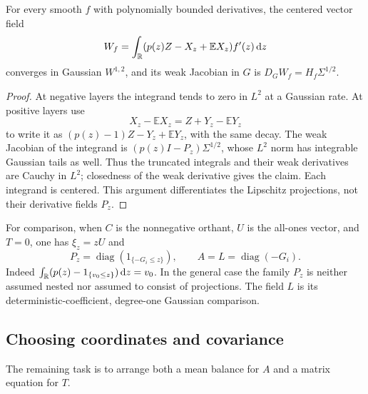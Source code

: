 \begin{lemma}\label{lem:projection-sobolev}
For every smooth $f$ with polynomially bounded derivatives, the centered vector field
\[
W_f=\int_{\mathbb{R}}(p(z)Z-X_z+\mathbb{E}X_z)f'(z)\,\mathrm{d} z
\]
converges in Gaussian $W^{1,2}$, and its weak Jacobian in $G$ is $D_GW_f=H_f\Sigma^{1/2}$.
\end{lemma}
\begin{proof}
At negative layers the integrand tends to zero in $L^2$ at a Gaussian rate. At positive layers use
\[
X_z-\mathbb{E}X_z=Z+Y_z-\mathbb{E}Y_z
\]
to write it as $(p(z)-1)Z-Y_z+\mathbb{E}Y_z$, with the same decay. The weak Jacobian of the integrand is $(p(z)I-P_z)\Sigma^{1/2}$, whose $L^2$ norm has integrable Gaussian tails as well. Thus the truncated integrals and their weak derivatives are Cauchy in $L^2$; closedness of the weak derivative gives the claim. Each integrand is centered. This argument differentiates the Lipschitz projections, not their derivative fields $P_z$.
\end{proof}

For comparison, when $C$ is the nonnegative orthant, $U$ is the all-ones vector, and $T=0$, one has $\xi_z=zU$ and
\[
P_z=\operatorname{diag}(1_{\{-G_i\le z\}}),\qquad
A=L=\operatorname{diag}(-G_i).
\]
Indeed $\int_{\mathbb{R}}(p(z)-1_{\{v_0\le z\}})\,\mathrm{d} z=v_0$. In the general case the family $P_z$ is neither assumed nested nor assumed to consist of projections. The field $L$ is its deterministic-coefficient, degree-one Gaussian comparison.

\subsection{Choosing coordinates and covariance}
The remaining task is to arrange both a mean balance for $A$ and a matrix equation for $T$.

